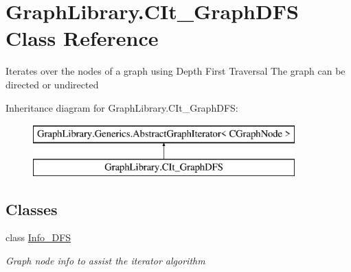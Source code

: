 \hypertarget{class_graph_library_1_1_c_it___graph_d_f_s}{}\section{Graph\+Library.\+C\+It\+\_\+\+Graph\+D\+F\+S Class Reference}
\label{class_graph_library_1_1_c_it___graph_d_f_s}


Iterates over the nodes of a graph using Depth First Traversal The graph can be directed or undirected  


Inheritance diagram for Graph\+Library.\+C\+It\+\_\+\+Graph\+D\+F\+S\+:\begin{figure}[H]
\begin{center}
\leavevmode
\includegraphics[height=2.000000cm]{class_graph_library_1_1_c_it___graph_d_f_s}
\end{center}
\end{figure}
\subsection*{Classes}
\begin{DoxyCompactItemize}
\item 
class \hyperlink{class_graph_library_1_1_c_it___graph_d_f_s_1_1_info___d_f_s}{Info\+\_\+\+D\+F\+S}
\begin{DoxyCompactList}\small\item\em Graph node info to assist the iterator algorithm \end{DoxyCompactList}\end{DoxyCompactItemize}
